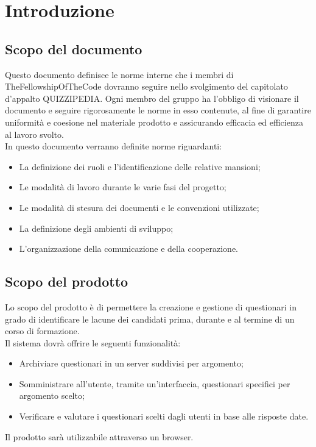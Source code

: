 \section{Introduzione}

\subsection{Scopo del documento}
Questo documento definisce le norme interne che i membri di TheFellowshipOfTheCode dovranno seguire nello svolgimento del capitolato d'appalto QUIZZIPEDIA. Ogni membro del gruppo ha l'obbligo di visionare il documento e seguire rigorosamente le norme in esso contenute, al fine di garantire uniformità e coesione nel materiale prodotto e assicurando efficacia ed efficienza al lavoro svolto.
\\In questo documento verranno definite norme riguardanti:
\begin{itemize}
\item
La definizione dei ruoli e l'identificazione delle relative mansioni;	
\item
Le modalità di lavoro durante le varie fasi del progetto;
\item
Le modalità di stesura dei documenti e le convenzioni utilizzate;
\item
La definizione degli ambienti di sviluppo;
\item
L'organizzazione della comunicazione e della cooperazione.
\end{itemize}

\subsection{Scopo del prodotto}
Lo scopo del prodotto è di permettere la creazione e gestione di questionari in grado di identificare le lacune dei candidati prima, durante e al termine di un corso di formazione. 
\\Il sistema dovrà offrire le seguenti funzionalità:
\begin{itemize}
\item
Archiviare questionari in un server suddivisi per argomento;
\item
Somministrare all'utente, tramite un'interfaccia, questionari specifici per argomento scelto;
\item
Verificare e valutare i questionari scelti dagli utenti in base alle risposte date.
\end{itemize}

Il prodotto sarà utilizzabile attraverso un browser.

